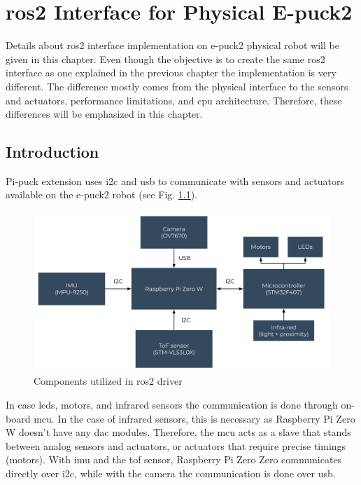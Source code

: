 \chapter{\acs{ros2} Interface for Physical E-puck2}
\label{chap:physical}

Details about \ac{ros2} interface implementation on e-puck2 physical robot will be given in this chapter. Even though the objective is to create the same \ac{ros2} interface as one explained in the previous chapter the implementation is very different. The difference mostly comes from the physical interface to the sensors and actuators, performance limitations, and \ac{cpu} architecture. Therefore, these differences will be emphasized in this chapter.

\section{Introduction}

Pi-puck extension uses \ac{i2c} and \ac{usb} to communicate with sensors and actuators available on the e-puck2 robot (see Fig. \ref{fig:physical:general}).

\begin{figure}[H]
    \centering
    \includegraphics[width=\textwidth]{physical/figures/general.pdf}
    \caption{Components utilized in \ac{ros2} driver}
    \label{fig:physical:general}
\end{figure}

In case \acp{led}, motors, and infrared sensors the communication is done through on-board \ac{mcu}. In the case of infrared sensors, this is necessary as Raspberry Pi Zero W doesn't have any \ac{dac} modules. Therefore, the \ac{mcu} acts as a slave that stands between analog sensors and actuators, or actuators that require precise timings (motors). With \ac{imu} and the \ac{tof} sensor, Raspberry Pi Zero Zero communicates directly over \ac{i2c}, while with the camera the communication is done over \ac{usb}. 

